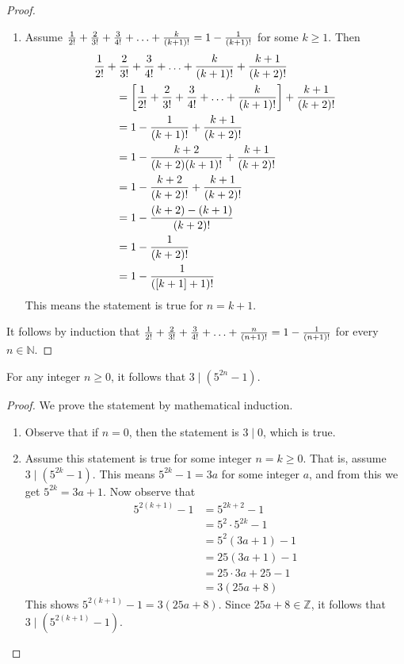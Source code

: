 \documentclass[DIN, pagenumber=false, fontsize=11pt, parskip=half]{scrartcl}
\begin{document}
\begin{problems}
\begin{proof}
\begin{enumerate}
            \item Assume $\frac{1}{2!}+\frac{2}{3!}+\frac{3}{4!}+\mathellipsis+\frac{k}{(k+1)!} = 1 - \frac{1}{(k+1)!}$ for some $k \geq 1$. Then
                \begin{align*}
                    \MoveEqLeft \frac{1}{2!}+\frac{2}{3!}+\frac{3}{4!}+\mathellipsis+\frac{k}{(k+1)!} + \frac{k+1}{(k+2)!}\\
                    & = \bigg[\frac{1}{2!}+\frac{2}{3!}+\frac{3}{4!}+\mathellipsis+\frac{k}{(k+1)!}\bigg] + \frac{k+1}{(k+2)!}\\
                    & = 1 - \frac{1}{(k+1)!} + \frac{k+1}{(k+2)!}\\
                    & = 1 - \frac{k+2}{(k+2)(k+1)!} + \frac{k+1}{(k+2)!}\\
                    & = 1 - \frac{k+2}{(k+2)!} + \frac{k+1}{(k+2)!}\\
                    & = 1 - \frac{(k+2)-(k+1)}{(k+2)!}\\
                    & = 1 - \frac{1}{(k+2)!}\\
                    & = 1 - \frac{1}{([k+1]+1)!}
                \end{align*}
                This means the statement is true for $n = k+1$.
        \end{enumerate}
        It follows by induction that $\frac{1}{2!}+\frac{2}{3!}+\frac{3}{4!}+\mathellipsis+\frac{n}{(n+1)!} = 1 - \frac{1}{(n+1)!}$ for every $n \in \mathbb{N}$.
    \end{proof}

    \problem For any integer $n \geq 0$, it follows that $3 \mid (5^{2n} - 1)$.
    \begin{proof}
        We prove the statement by mathematical induction.
        \begin{enumerate}
            \item Observe that if $n=0$, then the statement is $3 \mid 0$, which is true.

            \item Assume this statement is true for some integer $n = k \geq 0$.
                That is, assume $3 \mid (5^{2k}-1)$.
                This means $5^{2k}-1 = 3a$ for some integer $a$, and from this we get $5^{2k} = 3a + 1$.
                Now observe that
                \begin{align*}
                    5^{2(k+1)} - 1 &= 5^{2k+2}-1\\ 
                                   &= 5^2\cdot5^{2k}-1\\ 
                                   &= 5^2(3a+1)-1\\ 
                                   &= 25(3a+1)-1\\ 
                                   &= 25\cdot3a+25-1\\ 
                                   &= 3(25a+8)
                \end{align*}
                This shows $5^{2(k+1)}-1 = 3(25a+8)$. Since $25a+8 \in \mathbb{Z}$, it follows that $3 \mid (5^{2(k+1)}-1)$.
        \end{enumerate}


\end{proof}
\end{problems}
\end{document}
